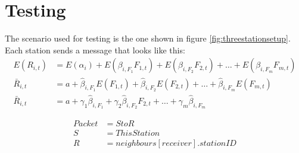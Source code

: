 \section{Testing}
The scenario used for testing is the one shown in figure \ref{fig:threestationsetup}.\\
Each station sends a message that looks like this:\\

\begin{align*}
  E(R_{i,t})    &= E(\alpha_i)+E(\beta_{i,F_1 } F_{1,t})+E(\beta_{i,F_2 } F_{2,t})+\ldots+E(\beta_{i,F_m } F_{m,t}) \\
  \bar{R}_{i,t} &= a+\hat{\beta}_{i,F_1 } E(F_{1,t})+\hat{\beta}_{i,F_2 } E(F_{2,t})+\ldots+\hat{\beta}_{i,F_m } E(F_{m,t}) \\
  \bar{R}_{i,t} &= a+\gamma_1\hat{\beta}_{i,F_1 } +\gamma_2\hat{\beta}_{i,F_2 } F_{2,t}+\ldots+\gamma_m\hat{\beta}_{i,F_m }
\end{align*}

\begin{align*}
Packet &= S to R\\
S &= ThisStation\\
R &= neighbours[receiver].stationID
\end{align*}

